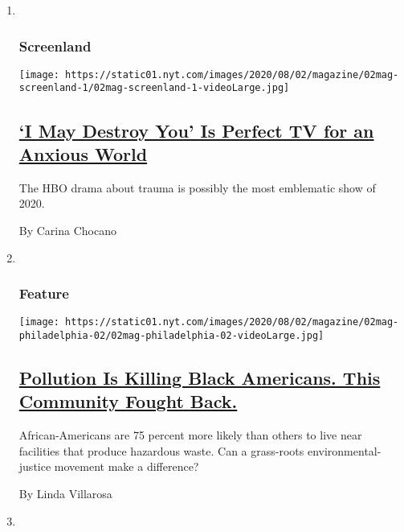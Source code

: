 \begin{enumerate}
\def\labelenumi{\arabic{enumi}.}
\item ~
  \hypertarget{screenland}{%
  \subsubsection{Screenland}\label{screenland}}

  \texttt{[image: https://static01.nyt.com/images/2020/08/02/magazine/02mag-screenland-1/02mag-screenland-1-videoLarge.jpg]}

  \hypertarget{i-may-destroy-you-is-perfect-tv-for-an-anxious-world}{%
  \subsection{\texorpdfstring{\href{/2020/07/29/magazine/i-may-destroy-you-hbo-michaela-coel.html}{`I
  May Destroy You' Is Perfect TV for an Anxious
  World}}{`I May Destroy You' Is Perfect TV for an Anxious World}}\label{i-may-destroy-you-is-perfect-tv-for-an-anxious-world}}

  The HBO drama about trauma is possibly the most emblematic show of
  2020.

  By Carina Chocano
\item ~
  \hypertarget{feature-2}{%
  \subsubsection{Feature}\label{feature-2}}

  \texttt{[image: https://static01.nyt.com/images/2020/08/02/magazine/02mag-philadelphia-02/02mag-philadelphia-02-videoLarge.jpg]}

  \hypertarget{pollution-is-killing-black-americans-this-community-fought-back}{%
  \subsection{\texorpdfstring{\href{/2020/07/28/magazine/pollution-philadelphia-black-americans.html}{Pollution
  Is Killing Black Americans. This Community Fought
  Back.}}{Pollution Is Killing Black Americans. This Community Fought Back.}}\label{pollution-is-killing-black-americans-this-community-fought-back}}

  African-Americans are 75 percent more likely than others to live near
  facilities that produce hazardous waste. Can a grass-roots
  environmental-justice movement make a difference?

  By Linda Villarosa
\item ~
  \hypertarget{talk}{%
}
\end{enumerate}
